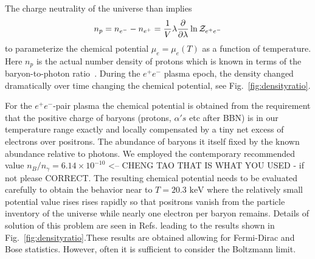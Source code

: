 \documentclass[a4paper]{article}
\newcommand*{\keV}{\text{ keV}}
\newcommand{\rf}[1]{Fig.~{\ref{#1}}}
\begin{document}
The charge neutrality of the universe than implies 
\begin{align}
    \label{chargeneutrality}
    n_{p}=n_{e^{-}}-n_{e^{+}}=\frac{1}{V}\lambda\frac{\partial}{\partial\lambda}\ln{\cal Z}_{e^{+}e^{-}}
\end{align}
to parameterize the chemical potential $\mu_e=\mu_e(T)$ as a function of temperature.  Here $n_{p}$ is the actual number density of protons which is known in terms of the baryon-to-photon ratio~\cite{workman2022pdg}.  During the $e^{+}e^{-}$ plasma epoch, the density changed dramatically over time changing the chemical potential, see \rf{fig:densityratio}.


For the $e^+e^-$-pair plasma the chemical potential is obtained from the requirement that the positive charge of baryons (protons, $\alpha's$ etc after BBN) is in our temperature range exactly and locally compensated by a tiny net excess of electrons over positrons.  The abundance of baryons it itself fixed by the known abundance relative to photons.  We employed the contemporary recommended value $n_B/n_\gamma=6.14\times 10^{-10}$ <-- CHENG TAO THAT IS WHAT YOU USED - if not please CORRECT. The resulting chemical potential  needs to be evaluated carefully to obtain the behavior near to $T=20.3\keV$ where the relatively small potential value rises rises rapidly so that positrons  vanish  from the particle inventory of the universe while nearly one electron per baryon remains.   Details of solution of this problem are seen in Refs.\;\cite{fromerth2012quarkgluon,rafelski2023short} leading to the results shown in \rf{fig:densityratio}.These results are obtained allowing for Fermi-Dirac and Bose statistics. However, often it is sufficient to consider  the Boltzmann limit. 
\end{document}
